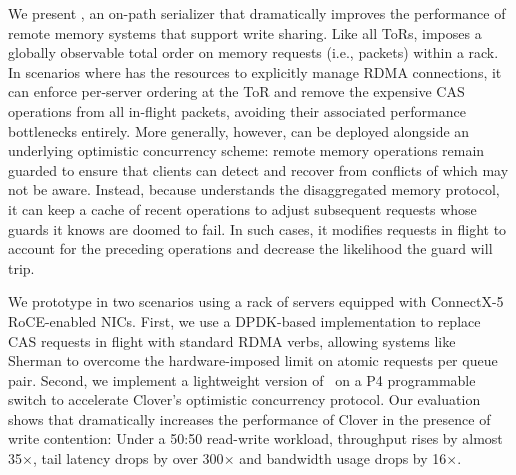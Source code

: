 We present {\sword}, an on-path serializer
that dramatically improves the performance of remote memory systems
that support write sharing.  Like all ToRs, {\sword} imposes a
globally observable total order on memory requests (i.e., packets)
within a rack.  In scenarios where {\sword} has the resources to
explicitly manage RDMA connections, it can enforce per-server ordering
at the ToR and remove the expensive CAS operations from all in-flight
packets, avoiding their associated performance bottlenecks entirely.
More generally, however, {\sword} can be deployed alongside an
underlying optimistic concurrency scheme: remote memory operations
remain guarded to ensure that clients can detect and recover from
conflicts of which {\sword} may not be aware.  Instead, because
{\sword} understands the disaggregated memory protocol, it can keep a
cache of recent operations to adjust subsequent requests whose
guards it knows are doomed to fail.  In such cases,
it modifies requests in
flight to account for the preceding operations and decrease the
likelihood the guard will trip.

We prototype {\sword} in two scenarios using a rack of servers
equipped with ConnectX-5 RoCE-enabled NICs.  First, we use a
DPDK-based implementation to replace CAS requests in flight with
standard RDMA verbs, allowing systems like Sherman to overcome the
hardware-imposed limit on atomic requests per queue pair.  Second, we
implement a lightweight version of \sword\ on a P4 programmable switch
to accelerate Clover's optimistic concurrency protocol. Our evaluation
shows that {\sword} dramatically increases the performance of Clover
in the presence of write contention: Under a 50:50 read-write
workload, throughput rises by almost 35$\times$, tail latency drops by
over 300$\times$ and bandwidth usage drops by 16$\times$.

